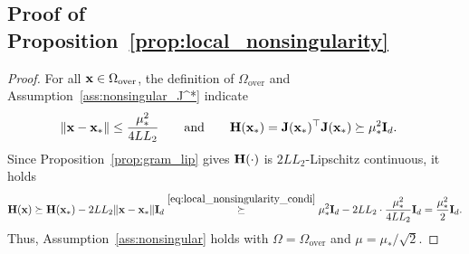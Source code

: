 \documentclass[11pt]{article}
\theoremstyle{plain}
\theoremstyle{definition}
\theoremstyle{remark}
\theoremstyle{plain}
\def\H{{\bf H}}
\def\I{{\bf I}}
\def \J{{\bf J}}
\def\x{{\bf x}}
\begin{document}
\subsection{Proof of Proposition~\ref{prop:local_nonsingularity}}
\label{app:proof_prop_local_nonsingularity}
\begin{proof}
For all $\x\in\Omega_{\mathrm{over}}$, the definition of
$\Omega_{\mathrm{over}}$ and Assumption~\ref{ass:nonsingular_J^*} indicate
\begin{align}
    \label{eq:local_nonsingularity_condi}
\|\x-\x_*\|
&\leq\frac{\mu_*^2}{4LL_2}
\qquad\text{and}\qquad
\H(\x_*)=\J(\x_*)^{\top}\J(\x_*)\succeq\mu_*^2\I_d.
\end{align}
Since Proposition~\ref{prop:gram_lip} gives $\H(\cdot)$ is $2LL_2$-Lipschitz continuous, it holds
\begin{align*}
\H(\x)
\succeq\H(\x_*)-2LL_2\|\x-\x_*\|\I_d\overset{\eqref{eq:local_nonsingularity_condi}}{\succeq}\mu_*^2\I_d-2LL_2\cdot\frac{\mu_*^2}{4LL_2}\I_d
=\frac{\mu_*^2}{2}\I_d.
\end{align*}
Thus, Assumption~\ref{ass:nonsingular} holds with $\Omega=\Omega_{\mathrm{over}}$ and
$\mu=\mu_*/\sqrt{2}$.
\end{proof}
\end{document}
